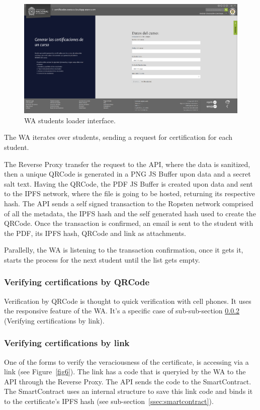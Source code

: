 \documentclass[runningheads]{llncs}
\begin{document}
\begin{figure}
\includegraphics[width=\textwidth]{05-loader.png}
\caption{WA students loader interface.}
\label{fig5}
\end{figure}

The WA iterates over students, sending a request for certification for each student.

The Reverse Proxy transfer the request to the API, where the data is sanitized, then a unique QRCode is generated in a PNG JS Buffer upon data and a secret salt text. Having the QRCode, the PDF JS Buffer is created upon data and sent to the IPFS network, where the file is going to be hosted, returning its respective hash. The API sends a self signed transaction to the Ropsten network comprised of all the metadata, the IPFS hash and the self generated hash used to create the QRCode. Once the transaction is confirmed, an email is sent to the student with the PDF, its IPFS hash, QRCode and link as attachments.

Parallelly, the WA is listening to the transaction confirmation, once it gets it, starts the process for the next student until the list gets empty.

\subsubsection{Verifying certifications by QRCode} \label{sssec:lbyQrcode}
Verification by QRCode is thought to quick verification with cell phones. It uses the responsive feature of the WA. It's a specific case of sub-sub-section \ref{sssec:lbyLink} (Verifying certifications by link).

\subsubsection{Verifying certifications by link} \label{sssec:lbyLink}
One of the forms to verify the veraciousness of the certificate, is accessing via a link (see Figure~\ref{fig6}). The link has a code that is queryied by the WA to the API through the Reverse Proxy. The API sends the code to the SmartContract. The SmartContract uses an internal structure to save this link code and binds it to the certificate's IPFS hash (see sub-section~\ref{ssec:smartcontract}).
\end{document}
